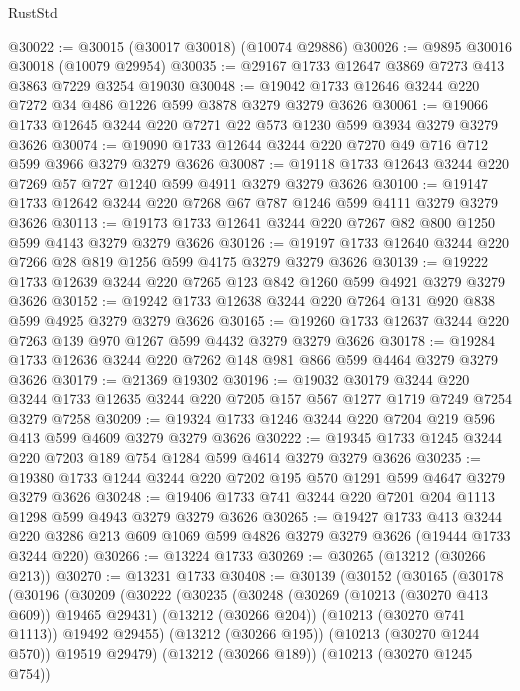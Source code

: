 \begin{lexlean}{RustStd}
\begin{coremodule}
@30022 := @30015 (@30017 @30018) (@10074 @29886)
@30026 := @9895 @30016 @30018 (@10079 @29954)
@30035 := @29167 @1733 @12647 @3869 @7273 @413 @3863 @7229 @3254 @19030
@30048 := @19042 @1733 @12646 @3244 @220 @7272 @34 @486 @1226 @599 @3878 @3279 @3279 @3626
@30061 := @19066 @1733 @12645 @3244 @220 @7271 @22 @573 @1230 @599 @3934 @3279 @3279 @3626
@30074 := @19090 @1733 @12644 @3244 @220 @7270 @49 @716 @712 @599 @3966 @3279 @3279 @3626
@30087 := @19118 @1733 @12643 @3244 @220 @7269 @57 @727 @1240 @599 @4911 @3279 @3279 @3626
@30100 := @19147 @1733 @12642 @3244 @220 @7268 @67 @787 @1246 @599 @4111 @3279 @3279 @3626
@30113 := @19173 @1733 @12641 @3244 @220 @7267 @82 @800 @1250 @599 @4143 @3279 @3279 @3626
@30126 := @19197 @1733 @12640 @3244 @220 @7266 @28 @819 @1256 @599 @4175 @3279 @3279 @3626
@30139 := @19222 @1733 @12639 @3244 @220 @7265 @123 @842 @1260 @599 @4921 @3279 @3279 @3626
@30152 := @19242 @1733 @12638 @3244 @220 @7264 @131 @920 @838 @599 @4925 @3279 @3279 @3626
@30165 := @19260 @1733 @12637 @3244 @220 @7263 @139 @970 @1267 @599 @4432 @3279 @3279 @3626
@30178 := @19284 @1733 @12636 @3244 @220 @7262 @148 @981 @866 @599 @4464 @3279 @3279 @3626
@30179 := @21369 @19302
@30196 := @19032
    @30179
    @3244
    @220
    @3244
    @1733
    @12635
    @3244
    @220
    @7205
    @157
    @567
    @1277
    @1719
    @7249
    @7254
    @3279
    @7258
@30209 := @19324 @1733 @1246 @3244 @220 @7204 @219 @596 @413 @599 @4609 @3279 @3279 @3626
@30222 := @19345 @1733 @1245 @3244 @220 @7203 @189 @754 @1284 @599 @4614 @3279 @3279 @3626
@30235 := @19380 @1733 @1244 @3244 @220 @7202 @195 @570 @1291 @599 @4647 @3279 @3279 @3626
@30248 := @19406 @1733 @741 @3244 @220 @7201 @204 @1113 @1298 @599 @4943 @3279 @3279 @3626
@30265 := @19427
    @1733
    @413
    @3244
    @220
    @3286
    @213
    @609
    @1069
    @599
    @4826
    @3279
    @3279
    @3626
    (@19444 @1733 @3244 @220)
@30266 := @13224 @1733
@30269 := @30265 (@13212 (@30266 @213))
@30270 := @13231 @1733
@30408 := @30139
    (@30152
      (@30165
        (@30178
          (@30196
            (@30209
              (@30222
                (@30235
                  (@30248
                    (@30269 (@10213 (@30270 @413 @609)) @19465 @29431)
                    (@13212 (@30266 @204))
                    (@10213 (@30270 @741 @1113))
                    @19492
                    @29455)
                  (@13212 (@30266 @195))
                  (@10213 (@30270 @1244 @570))
                  @19519
                  @29479)
                (@13212 (@30266 @189))
                (@10213 (@30270 @1245 @754))

\end{coremodule}
\end{lexlean}
